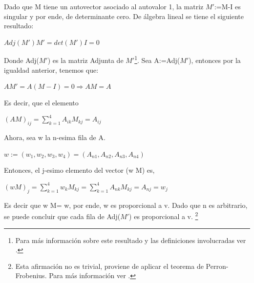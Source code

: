 \documentclass[12pt]{article}
\begin{document}
Dado que M tiene un autovector asociado al autovalor 1, la matriz $M'$:=M-I es singular y por ende, de 
determinante cero.\newline
De álgebra lineal se tiene el siguiente resultado:\newline
\begin{center}
$Adj(M')M' = det(M')I=0$
\end{center}
Donde Adj($M'$) es la matriz Adjunta de $M'$\footnote{Para más información sobre este resultado y las definiciones involucradas ver \cite{Ho}.}.\newline 
Sea A:=Adj($M'$), entonces por la igualdad anterior, tenemos que:
\begin{center}
$AM'=A(M-I)=0 \Rightarrow AM=A$
\end{center}
Es decir, que el elemento 
\begin{center}
$(AM)_{ij}=\sum_{k=1}^4 A_{ik} M_{kj} = A_{ij}$
\end{center}
Ahora, sea w la n-esima fila de A.
\begin{center}
$w:=(w_1,w_2,w_3,w_4)=(A_{n1},A_{n2},A_{n3},A_{n4})$
\end{center}
Entonces, el j-esimo elemento del vector (w M) es,
\begin{center}
$(w M)_j=\sum_{k=1}^4 w_k M_{kj} =\sum_{k=1}^4 A_{nk} M_{kj} = A_{nj}=w_j$
\end{center}
Es decir que w M= w, por ende, w es proporcional a v.
Dado que n es arbitrario, se puede concluir que cada fila de Adj($M'$) es proporcional a v.
\footnote{Esta afirmación no es trivial, proviene de aplicar el teorema de Perron-Frobenius. Para más información ver \cite{Ha}.}
\end{document}

